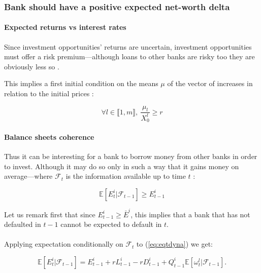 \documentclass{article}
\begin{document}
\subsubsection{Bank should have a positive expected net-worth delta}\label{expected losers}

\paragraph{Expected returns vs interest rates}
Since investment opportunities' returns are uncertain, investment opportunities must offer a risk premium---although loans to other banks are risky too they are obviously less so . 


This implies a first initial condition on the means $\mu$ of the vector of increases in relation to the initial prices :

    
    $$ \forall l \in \llbracket 1, m \rrbracket,~ \frac{\mu_l}{X_0^l} \geq r $$
    
    
\paragraph{Balance sheets coherence}
Thus it can be interesting for a bank to borrow money from other banks in order to invest. Although it may do so only in such a way that it gains money on average---where $\mathcal{F}_t$ is the information available up to time $t$  :

$$ \mathbb{E}[E_t ^i|\mathcal{F}_{t-1}] \geq E_{t-1}^i $$

Let us remark first that since $E_{t-1}^i \geq \bar{E}^i$, this implies that a bank that has not defaulted in $t-1$ cannot be expected to default in $t$.

\paragraph{}
Applying expectation conditionally on $\mathcal{F}_t$ to (\ref{eq:eqtdyna}) we get: 


$$\mathbb{E}[E_t^i|\mathcal{F}_{t-1}] = E_{t-1}^i + rL_{t-1}^i - rD_{t-1}^i + Q_{t-1}^{i} \mathbb{E}[\omega_t^l|\mathcal{F}_{t-1}].$$
\end{document}
